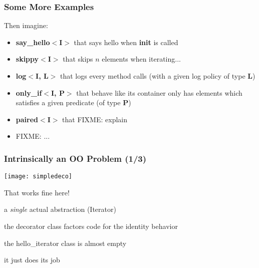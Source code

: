 \begin{frame}
  \frametitle{Some More Examples}

Then imagine:
\smallskip
%

\begin{itemize}
\item \textbf{say\_hello$<$I$>$} that says hello when \textbf{init} is called
\smallskip
%
\item \textbf{skippy$<$I$>$} that skips $n$ elements when iterating...
\smallskip
%
\item \textbf{log$<$I, L$>$} that logs every method calls (with a
  given log policy of type \textbf{L})
\smallskip
%
\item \textbf{only\_if$<$I, P$>$} that behave like its container only has
  elements which satisfies a given predicate (of type \textbf{P}) \smallskip
%
%
\item \textbf{paired$<$I$>$} that FIXME: explain
%
\item FIXME: ...
%
\end{itemize}

\end{frame}



\begin{frame}
  \frametitle{Intrinsically an OO Problem (1/3)}


\hspace*{-5mm}
\begin{minipage}{0.72\textwidth}
  \texttt{[image: simpledeco]}
\end{minipage}
\begin{minipage}{0.28\textwidth}
  That works fine here!
  \begin{itemize}
    {\scriptsize
  \item a \textit{single} actual abstraction (Iterator)
  \item the decorator class factors code for the identity behavior
  \item the hello\_iterator class is almost empty
  \item it just does its job
  }
  \end{itemize}
\end{minipage}

\end{frame}




